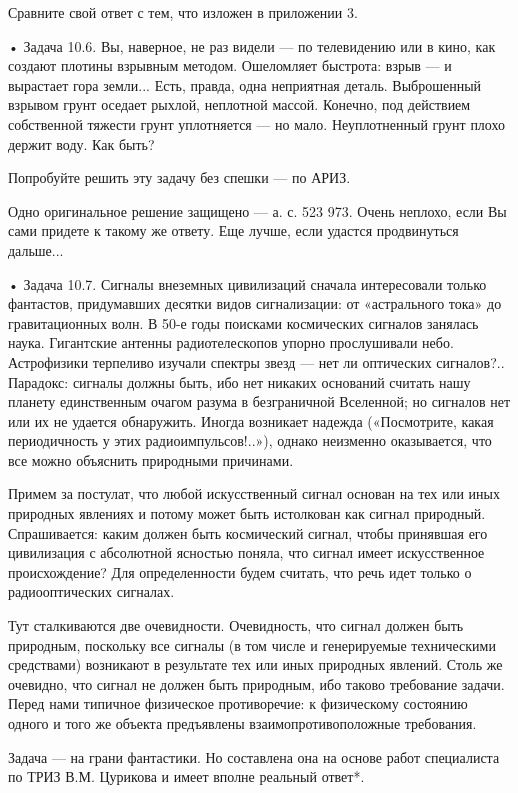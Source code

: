 Сравните свой ответ с тем, что изложен в приложении 3.

• Задача  10.6. Вы,  наверное, не  раз видели —  по телевидению  или в
кино, как создают плотины взрывным методом. Ошеломляет быстрота: взрыв
—  и вырастает  гора земли...  Есть, правда,  одна неприятная  деталь.
Выброшенный взрывом  грунт оседает рыхлой, неплотной  массой. Конечно,
под  действием  собственной  тяжести  грунт  уплотняется  —  но  мало.
Неуплотненный грунт плохо держит воду. Как быть?

Попробуйте решить эту задачу без спешки — по АРИЗ.

Одно оригинальное  решение защищено  — а. с.  523 973.  Очень неплохо,
если  Вы сами  придете к  такому же  ответу. Еще  лучше, если  удастся
продвинуться дальше...

•  Задача 10.7.  Сигналы  внеземных  цивилизаций сначала  интересовали
только   фантастов,  придумавших   десятки   видов  сигнализации:   от
«астрального   тока»    до   гравитационных   волн.   В    50-е   годы
поисками  космических  сигналов  занялась  наука.  Гигантские  антенны
радиотелескопов  упорно   прослушивали  небо.   Астрофизики  терпеливо
изучали  спектры  звезд  —  нет ли  оптических  сигналов?..  Парадокс:
сигналы должны  быть, ибо нет  никаких оснований считать  нашу планету
единственным очагом  разума в безграничной Вселенной;  но сигналов нет
или их  не удается обнаружить. Иногда  возникает надежда («Посмотрите,
какая  периодичность  у  этих  радиоимпульсов!..»),  однако  неизменно
оказывается, что все можно объяснить природными причинами.


Примем за постулат, что любой  искусственный сигнал основан на тех или
иных  природных явлениях  и потому  может быть  истолкован как  сигнал
природный. Спрашивается:  каким должен быть космический  сигнал, чтобы
принявшая  его цивилизация  с абсолютной  ясностью поняла,  что сигнал
имеет искусственное  происхождение? Для определенности  будем считать,
что речь идет только о радиооптических сигналах.

Тут  сталкиваются  две  очевидности. Очевидность,  что  сигнал  должен
быть  природным, поскольку  все сигналы  (в том  числе и  генерируемые
техническими средствами) возникают в результате тех или иных природных
явлений. Столь же  очевидно, что сигнал не должен  быть природным, ибо
таково требование задачи. Перед нами типичное физическое противоречие:
к  физическому   состоянию  одного  и  того   же  объекта  предъявлены
взаимопротивоположные требования.

Задача  — на  грани  фантастики.  Но составлена  она  на основе  работ
специалиста по ТРИЗ В.М. Цурикова и имеет вполне реальный ответ*.


